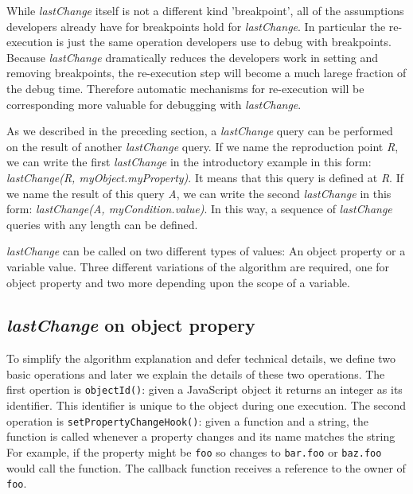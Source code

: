 \documentclass[preprint]{sigplanconf}
\begin{document}
While \textit{lastChange} itself is not a different kind 'breakpoint',
all of the assumptions developers already have for breakpoints hold
for \textit{lastChange}. In particular the re-execution is just the
same operation developers use to debug with breakpoints. Because
\textit{lastChange} dramatically reduces the developers work in
setting and removing breakpoints, the re-execution step will become a
much larege fraction of the debug time. Therefore automatic mechanisms
for re-execution will be corresponding more valuable for debugging
with \textit{lastChange}.

As we described in the preceding section, a \textit{lastChange} query can
be performed on the result of another \textit{lastChange} query. If we
name the reproduction point \textit{R}, we can write the first
\textit{lastChange} in the introductory example in this form:
\textit{lastChange(R, myObject.myProperty)}. It means that this query
is defined at \textit{R}. If we name the result of this query
\textit{A}, we can write the second \textit{lastChange} in this form:
\textit{lastChange(A, myCondition.value)}. In this way, a sequence of
\textit{lastChange} queries with any length can be defined.

\textit{lastChange} can be called on two different types of values: An
object property or a variable value. Three different variations of the
algorithm are required, one for object property and two more depending
upon the scope of a variable.

\subsection{\textit{lastChange} on object propery}
To simplify the algorithm explanation and defer technical details, we
define two basic operations and later we explain the details of these
two operations. The first opertion is \texttt{objectId()}: given a
JavaScript object it returns an integer as its identifier. This
identifier is unique to the object during one execution. The second
operation is \texttt{setPropertyChangeHook()}: given a function and a
string, the function is called whenever a property changes and its
name matches the string For example, if the property might be
\texttt{foo} so changes to \texttt{bar.foo} or \texttt{baz.foo} would
call the function.  The callback function receives a reference to the
owner of \texttt{foo}.
\end{document}
